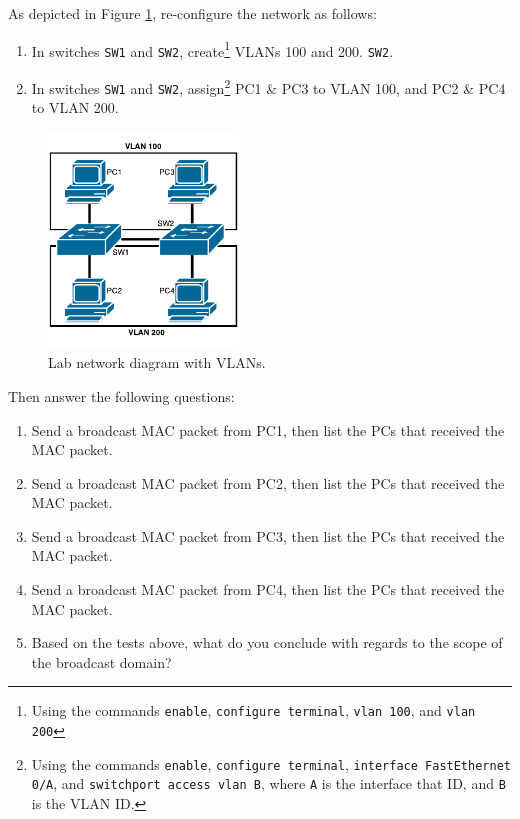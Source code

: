 \documentclass[pdftex,12pt,a4paper]{article}
\begin{document}
            As depicted in Figure \ref{fig:netdiag2}, re-configure the network
            as follows:
            \begin{enumerate}
                \item In switches \texttt{SW1} and \texttt{SW2},
                    create\footnote{Using the commands \texttt{enable},
                    \texttt{configure terminal}, \texttt{vlan 100}, and
                    \texttt{vlan 200}} VLANs 100 and 200.
                    \texttt{SW2}.
                \item In switches \texttt{SW1} and \texttt{SW2},
                    assign\footnote{Using the commands \texttt{enable},
                    \texttt{configure terminal}, \texttt{interface FastEthernet 0/A}, and
                    \texttt{switchport access vlan B}, where \texttt{A} is the
                    interface that ID, and \texttt{B} is the VLAN ID.} PC1 \& PC3 to
                    VLAN 100, and PC2 \& PC4 to VLAN 200.
            \end{enumerate}

            \begin{figure}[tbh]
                \centering
                \includegraphics[width=0.45\textwidth]{figures/netdiag2}
                \caption{Lab network diagram with VLANs.}
                \label{fig:netdiag2}
            \end{figure}

            Then answer the following questions:
            \begin{enumerate}
                \item Send a broadcast MAC packet from PC1, then list the PCs
                    that received the MAC packet.
                \item Send a broadcast MAC packet from PC2, then list the PCs
                    that received the MAC packet.
                \item Send a broadcast MAC packet from PC3, then list the PCs
                    that received the MAC packet.
                \item Send a broadcast MAC packet from PC4, then list the PCs
                    that received the MAC packet.
                \item Based on the tests above, what do you conclude with
                    regards to the scope of the broadcast domain?
            \end{enumerate}
\end{document}
